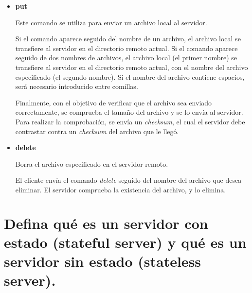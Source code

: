 \documentclass[osajnl,twocolumn,showpacs,superscriptaddress,10pt]{revtex4-1} %
\begin{document}
\begin{itemize}
    \item \textbf{put}
    
    Este comando se utiliza para enviar un archivo local al servidor.
    
    Si el comando aparece seguido del nombre de un archivo, el archivo local se transfiere al servidor en el directorio remoto actual. Si el comando aparece seguido de dos nombres de archivos, el archivo local (el primer nombre) se transfiere al servidor en el directorio remoto actual, con el nombre del archivo especificado (el segundo nombre). Si el nombre del archivo contiene espacios, será necesario introducido entre comillas.
    
    Finalmente, con el objetivo de verificar que el archivo sea enviado correctamente, se comprueba el tamaño del archivo y se lo envía al servidor. Para realizar la comprobación, se envía un \textit{checksum}, el cual el servidor debe contrastar contra un \textit{checksum} del archivo que le llegó.

    \item \textbf{delete}
    
    Borra el archivo especificado en el servidor remoto.
    
    El cliente envía el comando \textit{delete} seguido del nombre del archivo que desea eliminar. El servidor comprueba la existencia del archivo, y lo elimina.
\end{itemize}

\section{Defina qué es un servidor con estado (stateful server) y qué es un servidor sin estado (stateless server).}
\end{document}
